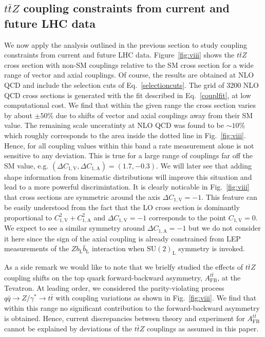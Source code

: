 \documentclass[preprint]{JHEP3}
\def\ttbZ{t\bar{t}Z}
\def\ttb{t\bar{t}}
\def\ConeA{C_{1,\mathrm{A}}}
\def\ConeV{C_{1,\mathrm{V}}}
\begin{document}
\subsection{$\ttbZ$ coupling constraints from current and future LHC data}
\label{sect:CouplLimits}

We now apply the analysis outlined in the previous section to study coupling constraints from current and future LHC data.
Figure~\ref{fig:viii} shows the $\ttbZ$ cross section with non-SM couplings relative to the SM cross section 
for a wide range of vector and axial couplings. 
Of course, the results are obtained at NLO QCD and include the selection cuts of Eq.~\ref{selectioncuts}.
The grid of 3200 NLO QCD cross sections is generated with the fit described in Eq.~\ref{couplfit}, at low computational cost.
We find that within the given range the cross section varies by about $\pm 50\%$ due to shifts of vector and axial couplings away from their SM value.
The remaining scale unceratinty at NLO QCD was found to be $\sim 10\%$ which roughly corresponds to the area inside the dotted line in Fig.~\ref{fig:viii}.
Hence, for all coupling values within this band a rate measurement alone is not sensitive to any deviation.
This is true for a large range of couplings far off the SM value, e.g. $(\Delta\ConeV,\Delta\ConeA)=(1.7,-0.3)$.
We will later see that adding shape information from kinematic distributions will improve this situation and lead to a more powerful discrimintation. 
It is clearly noticable in Fig.~\ref{fig:viii} that cross sections are symmetric around the axis $\Delta\ConeV=-1$. 
This feature can be easily understood from the fact that the LO cross section is dominantly proportional to 
$\ConeV^2+\ConeA^2$ and $\Delta\ConeV=-1$ corresponds to the point $\ConeV=0$.
We expect to see a similar symmetry around $\Delta\ConeA=-1$ but we do not consider it here since the sign of the axial coupling is already constrained from 
LEP measurements of the $Zb_\mathrm{L}\bar{b}_\mathrm{L}$ interaction when $\mathrm{SU(2)}_\mathrm{L}$ symmetry is invoked.


As a side remark we would like to note that we brielfy studied the effects of $\ttbZ$ coupling shifts on the top quark forward-backward asymmetry, $A_\mathrm{FB}^{\ttb}$, 
at the Tevatron.
At leading order, we considered the parity-violating process $q \bar{q} \to Z/\gamma^* \to \ttb$ with coupling variations as shown in Fig.~\ref{fig:viii}.
We find that within this range no significant contribution to the forward-backward asymmetry is obtained.
Hence, current discrepancies between theory and experiment for $A_\mathrm{FB}^{\ttb}$ cannot be explained by deviations of the $\ttbZ$ couplings as
assumed in this paper.
\end{document}
